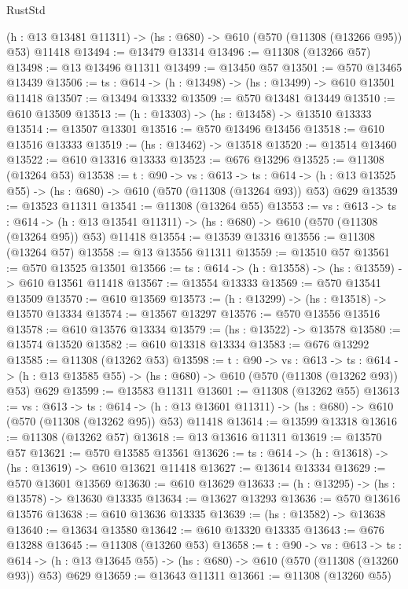 \begin{lexlean}{RustStd}
\begin{coremodule}
  (h : @13 @13481 @11311) -> (hs : @680) -> @610 (@570 (@11308 (@13266 @95)) @53) @11418
@13494 := @13479 @13314
@13496 := @11308 (@13266 @57)
@13498 := @13 @13496 @11311
@13499 := @13450 @57
@13501 := @570 @13465 @13439
@13506 := {ts : @614} -> (h : @13498) -> (hs : @13499) -> @610 @13501 @11418
@13507 := @13494 @13332
@13509 := @570 @13481 @13449
@13510 := @610 @13509
@13513 := (h : @13303) -> (hs : @13458) -> @13510 @13333
@13514 := @13507 @13301
@13516 := @570 @13496 @13456
@13518 := @610 @13516 @13333
@13519 := (hs : @13462) -> @13518
@13520 := @13514 @13460
@13522 := @610 @13316 @13333
@13523 := @676 @13296
@13525 := @11308 (@13264 @53)
@13538 := {t : @90} ->
  {vs : @613} ->
  {ts : @614} -> (h : @13 @13525 @55) -> (hs : @680) -> @610 (@570 (@11308 (@13264 @93)) @53) @629
@13539 := @13523 @11311
@13541 := @11308 (@13264 @55)
@13553 := {vs : @613} ->
  {ts : @614} ->
  (h : @13 @13541 @11311) -> (hs : @680) -> @610 (@570 (@11308 (@13264 @95)) @53) @11418
@13554 := @13539 @13316
@13556 := @11308 (@13264 @57)
@13558 := @13 @13556 @11311
@13559 := @13510 @57
@13561 := @570 @13525 @13501
@13566 := {ts : @614} -> (h : @13558) -> (hs : @13559) -> @610 @13561 @11418
@13567 := @13554 @13333
@13569 := @570 @13541 @13509
@13570 := @610 @13569
@13573 := (h : @13299) -> (hs : @13518) -> @13570 @13334
@13574 := @13567 @13297
@13576 := @570 @13556 @13516
@13578 := @610 @13576 @13334
@13579 := (hs : @13522) -> @13578
@13580 := @13574 @13520
@13582 := @610 @13318 @13334
@13583 := @676 @13292
@13585 := @11308 (@13262 @53)
@13598 := {t : @90} ->
  {vs : @613} ->
  {ts : @614} -> (h : @13 @13585 @55) -> (hs : @680) -> @610 (@570 (@11308 (@13262 @93)) @53) @629
@13599 := @13583 @11311
@13601 := @11308 (@13262 @55)
@13613 := {vs : @613} ->
  {ts : @614} ->
  (h : @13 @13601 @11311) -> (hs : @680) -> @610 (@570 (@11308 (@13262 @95)) @53) @11418
@13614 := @13599 @13318
@13616 := @11308 (@13262 @57)
@13618 := @13 @13616 @11311
@13619 := @13570 @57
@13621 := @570 @13585 @13561
@13626 := {ts : @614} -> (h : @13618) -> (hs : @13619) -> @610 @13621 @11418
@13627 := @13614 @13334
@13629 := @570 @13601 @13569
@13630 := @610 @13629
@13633 := (h : @13295) -> (hs : @13578) -> @13630 @13335
@13634 := @13627 @13293
@13636 := @570 @13616 @13576
@13638 := @610 @13636 @13335
@13639 := (hs : @13582) -> @13638
@13640 := @13634 @13580
@13642 := @610 @13320 @13335
@13643 := @676 @13288
@13645 := @11308 (@13260 @53)
@13658 := {t : @90} ->
  {vs : @613} ->
  {ts : @614} -> (h : @13 @13645 @55) -> (hs : @680) -> @610 (@570 (@11308 (@13260 @93)) @53) @629
@13659 := @13643 @11311
@13661 := @11308 (@13260 @55)

\end{coremodule}
\end{lexlean}
